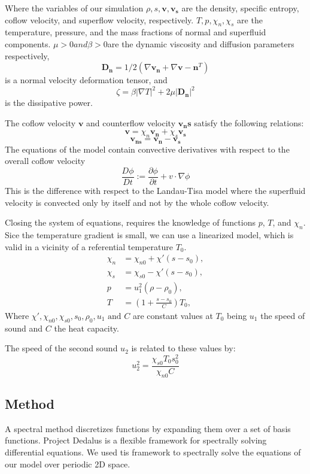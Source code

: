 \documentclass{article}
\begin{document}
Where the variables of our simulation  \(\rho, s, \mathbf{v}, \mathbf{v_s}\) are the density, specific entropy, coflow velocity, and superflow velocity, respectively.
\(T, p, \chi_n, \chi_s\) are the temperature, pressure, and the mass fractions of normal and superfluid components. 
\(\mu > 0 and \beta>0 \)are the dynamic viscosity and diffusion parameters respectively, 
\[\mathbf{D_n} = 1/2(\nabla \mathbf{v_n} +  \nabla \mathbf{v-n}^T)\] 
is a normal velocity deformation tensor, and
\[\zeta = \beta |\nabla T|^2 + 2 \mu |\mathbf{D_n}|^2\]
is the dissipative power.


The coflow velocity \(\mathbf{v}\) and counterflow velocity \( \mathbf{v_ns}\) satisfy the following relations:
\[\mathbf{v} = \chi_n \mathbf{v_n} + \chi_s \mathbf{v_s}\]
\[\mathbf{v_{ns}}  = \mathbf{v_n} - \mathbf{v_s}\]
The equations of the model contain convective derivatives with respect to the overall coflow velocity
\[\frac{D\phi}{Dt} := \frac{\partial \phi}{\partial t} + v \cdot \nabla \phi\]
This is the difference with respect to the Landau-Tisa model where the superfluid velocity is convected only by itself and not by the whole coflow velocity.

Closing the system of equations, requires the knowledge of functions \(p\), \(T\), and \(\chi_n\).
Sice the temperature gradient is small, we can use a linearized model, which is valid in a vicinity of a referential temperature \(T_0\).
\begin{align}
    \chi_n &= \chi_{n0} + \chi'(s-s_0),\\
    \chi_s &= \chi_{s0} - \chi'(s-s_0),\\
    p &= u_1^2(\rho-\rho_0), \\
    T &= (1+\frac{s-s_0}{C})T_0,
\end{align}
Where \(\chi', \chi_{n0}, \chi_{s0}, s_0, \rho_0, u_1 \text{ and } C\) are constant values at \(T_0\) being 
\(u_1\) the speed of sound and \(C\) the heat capacity. 

The speed of the second sound \(u_2\) is related to these values by:
\[u_2^2 = \frac{\chi_{s0}T_0s_0^2}{\chi_{n0}C}\]
\subsection{Method}
A spectral method discretizes functions by expanding them over a set of basis functions.
Project Dedalus\cite{Dedalus} is a flexible framework for spectrally solving differential equations. We used tis framework to spectrally solve the equations of our model over periodic 2D space.
\end{document}
